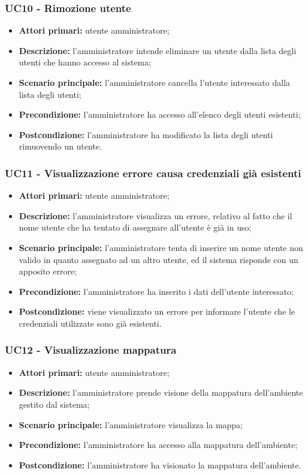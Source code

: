 \subsubsection{UC10 - Rimozione utente}
\begin{itemize}
	\item \textbf{Attori primari:} utente amministratore;
	\item \textbf{Descrizione:} l'amministratore intende eliminare un utente dalla lista degli utenti che hanno accesso al sistema;
	\item \textbf{Scenario principale:} l'amministratore cancella l'utente interessato dalla lista degli utenti;
	\item \textbf{Precondizione:} l'amministratore ha accesso all'elenco degli utenti esistenti;
	\item \textbf{Postcondizione:} l'amministratore ha modificato la lista degli utenti rimuovendo un utente.
\end{itemize}

\subsubsection{UC11 - Visualizzazione errore causa credenziali già esistenti}
	\begin{itemize}
		\item \textbf{Attori primari:} utente amministratore;
		\item \textbf{Descrizione:} l'amministratore visualizza un errore, relativo al fatto che il nome utente che ha tentato di assegnare all'utente è già in uso;
		\item \textbf{Scenario principale:} l'amministratore tenta di inserire un nome utente non valido in quanto assegnato ad un altro utente, ed il sistema risponde con un apposito errore;
		\item \textbf{Precondizione:} l'amministratore ha inserito i dati dell'utente interessato;
		\item \textbf{Postcondizione:} viene visualizzato un errore per informare l'utente che le credenziali utilizzate sono già esistenti.
	\end{itemize}

\subsubsection{UC12 - Visualizzazione mappatura}
	\begin{itemize}
		\item \textbf{Attori primari:} utente amministratore;
		\item \textbf{Descrizione:} l'amministratore prende visione della mappatura dell'ambiente gestito dal sistema;
		\item \textbf{Scenario principale:} l'amministratore visualizza la mappa;
		\item \textbf{Precondizione:} l'amministratore ha accesso alla mappatura dell'ambiente;
		\item \textbf{Postcondizione:} l'amministratore ha visionato la mappatura dell'ambiente.
	\end{itemize}

